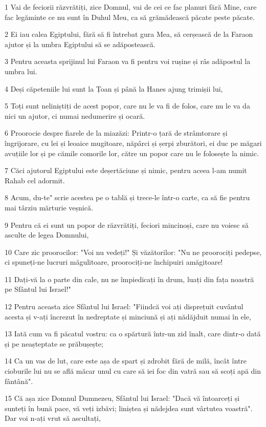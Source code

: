 \par 1 Vai de feciorii răzvrătiți, zice Domnul, vai de cei ce fac planuri fără Mine, care fac legăminte ce nu sunt în Duhul Meu, ca să grămădească păcate peste păcate.
\par 2 Ei iau calea Egiptului, fără să fi întrebat gura Mea, să cerșească de la Faraon ajutor și la umbra Egiptului să se adăpostească.
\par 3 Pentru aceasta sprijinul lui Faraon va fi pentru voi rușine și râs adăpostul la umbra lui.
\par 4 Deși căpeteniile lui sunt la Țoan și până la Hanes ajung trimișii lui,
\par 5 Toți sunt neliniștiți de acest popor, care nu le va fi de folos, care nu le va da nici un ajutor, ci numai nedumerire și ocară.
\par 6 Proorocie despre fiarele de la miazăzi: Printr-o țară de strâmtorare și îngrijorare, cu lei și leoaice mugitoare, năpârci și șerpi zburători, ei duc pe măgari avuțiile lor și pe cămile comorile lor, către un popor care nu le folosește la nimic.
\par 7 Căci ajutorul Egiptului este deșertăciune și nimic, pentru aceea l-am numit Rahab cel adormit.
\par 8 Acum, du-te" scrie acestea pe o tablă și trece-le într-o carte, ca să fie pentru mai târziu mărturie veșnică.
\par 9 Pentru că ei sunt un popor de răzvrătiți, feciori mincinoși, care nu voiesc să asculte de legea Domnului,
\par 10 Care zic proorocilor: "Voi nu vedeți!" Și văzătorilor: "Nu ne proorociți pedepse, ci spuneți-ne lucruri măgulitoare, proorociți-ne închipuiri amăgitoare!
\par 11 Dați-vă la o parte din cale, nu ne împiedicați în drum, luați din fața noastră pe Sfântul lui Israel!"
\par 12 Pentru aceasta zice Sfântul lui Israel: "Fiindcă voi ați disprețuit cuvântul acesta și v-ați încrezut în nedreptate și minciună și ați nădăjduit numai în ele,
\par 13 Iată cum va fi păcatul vostru: ca o spărtură într-un zid înalt, care dintr-o dată și pe neașteptate se prăbușește;
\par 14 Ca un vas de lut, care este așa de spart și zdrobit fără de milă, încât între cioburile lui nu se află măcar unul cu care să iei foc din vatră sau să scoți apă din fântână".
\par 15 Că așa zice Domnul Dumnezeu, Sfântul lui Israel: "Dacă vă întoarceți și sunteți în bună pace, vă veți izbăvi; liniștea și nădejdea sunt vârtutea voastră". Dar voi n-ați vrut să ascultați,
